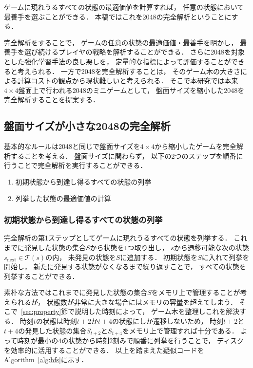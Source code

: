 ゲームに現れうるすべての状態の最適価値を計算すれば， 任意の状態において最善手を選ぶことができる．
本稿ではこれを2048の完全解析ということにする．

完全解析をすることで， ゲームの任意の状態の最適価値・最善手を明かし， 最善手を選び続けるプレイヤの戦略を解析することができる．
さらに2048を対象とした強化学習手法の良し悪しを， 定量的な指標によって評価することができると考えられる．
一方で2048を完全解析することは， そのゲーム木の大きさによる計算コストの観点から現状難しいと考えられる．
そこで本研究では本来$4\times4$盤面上で行われる2048のミニゲームとして， 盤面サイズを縮小した2048を完全解析することを提案する．

\subsection{盤面サイズが小さな2048の完全解析}
\label{sec:mini2048}
基本的なルールは2048と同じで盤面サイズを$4\times4$から縮小したゲームを完全解析することを考える．
盤面サイズに関わらず， 以下の$2$つのステップを順番に行うことで完全解析を実行することができる．
\begin{enumerate}
    \item 初期状態から到達し得るすべての状態の列挙
    \item 列挙した状態の最適価値の計算
\end{enumerate}

\subsubsection{初期状態から到達し得るすべての状態の列挙}
\label{subsec:enumeration}
完全解析の第1ステップとしてゲームに現れうるすべての状態を列挙する．
これまでに発見した状態の集合$S$から状態を$1$つ取り出し， $s$から遷移可能な次の状態$s_{\text{next}} \in \mathcal{T}(s)$の内， 未発見の状態を$S$に追加する．
初期状態を$S$に入れて列挙を開始し， 新たに発見する状態がなくなるまで繰り返すことで， すべての状態を列挙することができる．

素朴な方法ではこれまでに発見した状態の集合$S$をメモリ上で管理することが考えられるが， 状態数が非常に大きな場合にはメモリの容量を超えてしまう．
そこで~\ref{sec:property}節で説明した時刻によって， ゲーム木を整理しこれを解決する．
時刻$t$の状態は時刻$t+2$か$t+4$の状態にしか遷移しないため， 時刻$t+2$と$t+4$の発見した状態の集合$S_{t+2}$と$S_{t+4}$をメモリ上で管理すれば十分である．
よって時刻が最小の$4$の状態から時刻$2$刻みで順番に列挙を行うことで， ディスクを効率的に活用することができる．
以上を踏まえた疑似コードをAlgorithm~\ref{alg:bfs}に示す．

